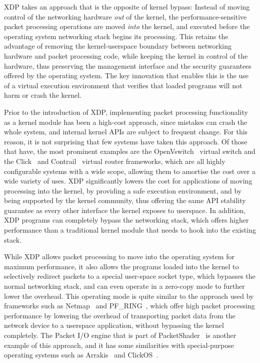 \documentclass[sigconf]{acmart}
\begin{document}
XDP takes an approach that is the opposite of kernel bypass: Instead of moving
control of the networking hardware \emph{out} of the kernel, the
performance-sensitive packet processing operations are moved \emph{into} the
kernel, and executed before the operating system networking stack begins its
processing. This retains the advantage of removing the kernel-userspace boundary
between networking hardware and packet processing code, while keeping the kernel
in control of the hardware, thus preserving the management interface and the
security guarantees offered by the operating system. The key innovation that
enables this is the use of a virtual execution environment that verifies that
loaded programs will not harm or crash the kernel.

Prior to the introduction of XDP, implementing packet processing functionality
as a kernel module has been a high-cost approach, since mistakes can crash the
whole system, and internal kernel APIs are subject to frequent change. For this
reason, it is not surprising that few systems have taken this approach. Of those
that have, the most prominent examples are the OpenVswitch~\cite{openvswitch}
virtual switch and the Click~\cite{morris1999click} and Contrail~\cite{contrail}
virtual router frameworks, which are all highly configurable systems with a wide
scope, allowing them to amortise the cost over a wide variety of uses. XDP
significantly lowers the cost for applications of moving processing into the
kernel, by providing a safe execution environment, and by being supported by the
kernel community, thus offering the same API stability guarantee as every other
interface the kernel exposes to userspace. In addition, XDP programs can
completely bypass the networking stack, which offers higher performance than a
traditional kernel module that needs to hook into the existing stack.

While XDP allows packet processing to move into the operating system for maximum
performance, it also allows the programs loaded into the kernel to selectively
redirect packets to a special user-space socket type, which bypasses the normal
networking stack, and can even operate in a zero-copy mode to further lower the
overhead. This operating mode is quite similar to the approach used by
frameworks such as Netmap~\cite{rizzo2012netmap} and
PF\_RING~\cite{deri2009modern}, which offer high packet processing performance
by lowering the overhead of transporting packet data from the network device to
a userspace application, without bypassing the kernel completely. The Packet I/O
engine that is part of PacketShader~\cite{han2010packetshader} is another
example of this approach, and it has some similarities with special-purpose
operating systems such as Arrakis~\cite{peter2016arrakis} and
ClickOS~\cite{martins2014clickos}.
\end{document}
